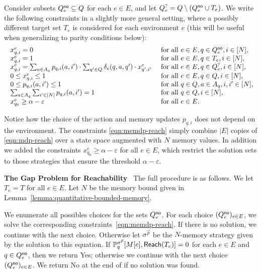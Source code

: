 \documentclass[a4paper,USenglish,cleveref, autoref, thm-restate]{lipics-v2021}
\let\epsilon\varepsilon
\def\abs#1{\ensuremath{\lvert #1 \rvert}}
\def\myparagraph#1{\noindent\textbf{#1}~}
\newcommand*{\pr}{\mathbb{P}}
\newcommand\Reach{\textrm{\sf Reach}}
\begin{document}
Consider subsets $Q^{\textsf{no}}_e \subseteq Q$ for each $e \in E$,
and let $Q^{?}_e = Q \setminus (Q^{\textsf{no}}_e \cup T_e)$.
We write the following constraints in a slightly more general setting, 
where a possibly different target set $T_e$ is considered for each environment $e$
(this will be useful when generalizing to parity conditions below):
\begin{equation}
  \label{eqn:memdp-reach}
  \!\!\!\!\begin{array}{lll}
    &x_{q,i}^e = 0  & \text{ for all } e \in E, q \in \Qno_e, i \in [N], \\
    &x_{q,i}^e = 1  & \text{ for all } e \in E, q \in T_e,    i \in [N], \\
    &x_{q,i}^e = \sum_{a \in A_q} p_{q,i}(a,i') \cdot \sum_{q' \in Q} \delta_e(q,a,q') \cdot x_{q',i'}^e  & \text{ for all } e \in E, q \in \Qquestion_e, i \in [N], \\
    &0 \leq x_{q,i}^e \leq 1  & \text{ for all } e \in E, q \in Q, i \in [N], \\
    &0 \leq p_{q,i}(a,i') \leq 1  & \text{ for all } q \in Q, a \in A_q, i,i' \in [N], \\
    &\sum_{a \in A_q}\sum_{i' \in [N]} p_{q,i}(a,i') = 1  & \text{ for all } q \in Q, i \in [N],\\
    &x_{q_0}^e \geq \alpha-\epsilon  & \text{ for all } e \in E.
  \end{array}
\end{equation}

Notice how the choice of the action and memory updates $p_{q,i}$ does not depend on the environment.
The constraints \eqref{eqn:memdp-reach} simply combine $\abs{E}$ copies of \eqref{eqn:mdp-reach}
over a state space augmented with $N$ memory values. In addition 
we added the constraints $x_{q_0}^e \geq \alpha-\epsilon$ for all $e \in E$, 
which restrict the solution sets to those strategies that ensure the threshold $\alpha-\epsilon$.

\smallskip
\myparagraph{The Gap Problem for Reachability}
The full procedure is as follows. We let $T_e = T$ for all $e \in E$.
Let $N$ be the memory bound given in Lemma~\ref{lemma:quantitative-bounded-memory}.

We enumerate all possibles choices for the sets $Q^{\textsf{no}}_e$.
For each choice $(Q^{\textsf{no}}_e)_{e\in E}$, we solve the corresponding constraints~\eqref{eqn:memdp-reach}.
If there is no solution, we continue with the next choice.
Otherwise let $\sigma^{\vec{p}}$ be the $N$-memory strategy given by the solution to this equation.
If $\pr_q^{\sigma^{\vec{p}}}[M[e], \Reach(T_e)] = 0$ for each $e \in E$ and $q \in Q^{\textsf{no}}_e$, 
then we return \textsf{Yes};
otherwise we continue with the next choice $(Q^{\textsf{no}}_e)_{e\in E}$. 
We return \textsf{No} at the end of if no solution was found.
\end{document}
